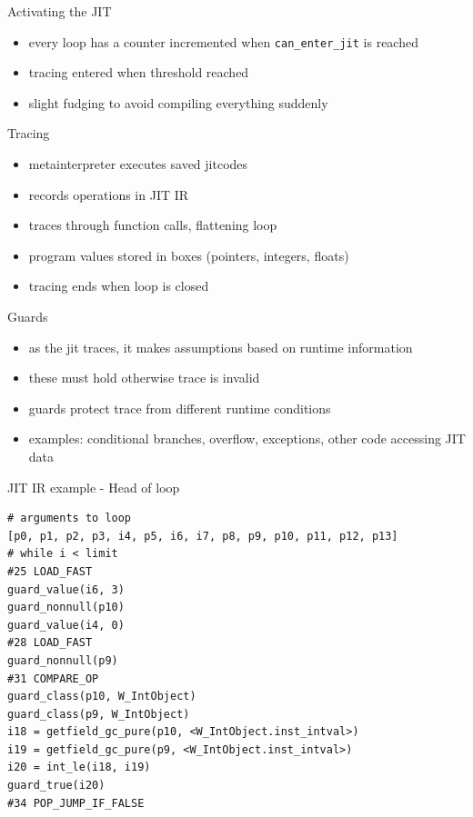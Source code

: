 \documentclass[14pt]{beamer}
\begin{document}
\begin{frame}[fragile]{Activating the JIT}
\begin{itemize}
\item every loop has a counter incremented when \verb+can_enter_jit+ is reached
\item tracing entered when threshold reached
\item slight fudging to avoid compiling everything suddenly
\end{itemize}
\end{frame}

\begin{frame}{Tracing}
\begin{itemize}
\item metainterpreter executes saved jitcodes
\item records operations in JIT IR
\item traces through function calls, flattening loop
\item program values stored in boxes (pointers, integers, floats)
\item tracing ends when loop is closed
\end{itemize}
\end{frame}

\begin{frame}{Guards}
\begin{itemize}
\item as the jit traces, it makes assumptions based on runtime information
\item these must hold otherwise trace is invalid
\item guards protect trace from different runtime conditions
\item examples: conditional branches, overflow, exceptions, other code accessing JIT data
\end{itemize}
\end{frame}

\begin{frame}[fragile]{JIT IR example - Head of loop}
\footnotesize{
\begin{verbatim}
# arguments to loop
[p0, p1, p2, p3, i4, p5, i6, i7, p8, p9, p10, p11, p12, p13]
# while i < limit
#25 LOAD_FAST
guard_value(i6, 3)
guard_nonnull(p10)
guard_value(i4, 0)
#28 LOAD_FAST
guard_nonnull(p9)
#31 COMPARE_OP
guard_class(p10, W_IntObject)
guard_class(p9, W_IntObject)
i18 = getfield_gc_pure(p10, <W_IntObject.inst_intval>)
i19 = getfield_gc_pure(p9, <W_IntObject.inst_intval>)
i20 = int_le(i18, i19)
guard_true(i20)
#34 POP_JUMP_IF_FALSE
\end{verbatim}
}
\end{frame}
\end{document}
